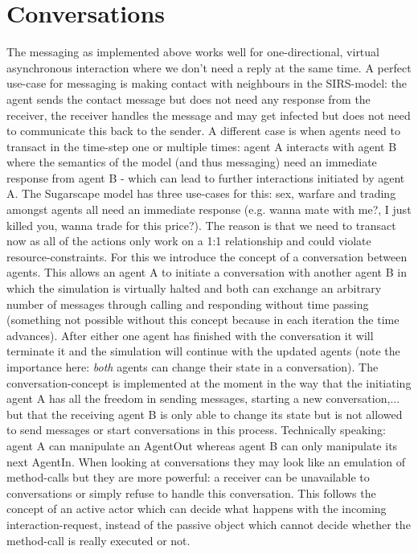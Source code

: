 
\section{Conversations}
The messaging as implemented above works well for one-directional, virtual asynchronous interaction where we don't need a reply at the same time. A perfect use-case for messaging is making contact with neighbours in the SIRS-model: the agent sends the contact message but does not need any response from the receiver, the receiver handles the message and may get infected but does not need to communicate this back to the sender. 
A different case is when agents need to transact in the time-step one or multiple times: agent A interacts with agent B where the semantics of the model (and thus messaging) need an immediate response from agent B - which can lead to further interactions initiated by agent A. The Sugarscape model has three use-cases for this: sex, warfare and trading amongst agents all need an immediate response (e.g. wanna mate with me?, I just killed you, wanna trade for this price?). The reason is that we need to transact now as all of the actions only work on a 1:1 relationship and could violate resource-constraints.
For this we introduce the concept of a conversation between agents. This allows an agent A to initiate a conversation with another agent B in which the simulation is virtually halted and both can exchange an arbitrary number of messages through calling and responding without time passing (something not possible without this concept because in each iteration the time advances). After either one agent has finished with the conversation it will terminate it and the simulation will continue with the updated agents (note the importance here: \textit{both} agents can change their state in a conversation). The conversation-concept is implemented at the moment in the way that the initiating agent A has all the freedom in sending messages, starting a new conversation,... but that the receiving agent B is only able to change its state but is not allowed to send messages or start conversations in this process. Technically speaking: agent A can manipulate an AgentOut whereas agent B can only manipulate its next AgentIn.
When looking at conversations they may look like an emulation of method-calls but they are more powerful: a receiver can be unavailable to conversations or simply refuse to handle this conversation. This follows the concept of an active actor which can decide what happens with the incoming interaction-request, instead of the passive object which cannot decide whether the method-call is really executed or not.

